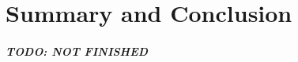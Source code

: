 \graphicspath{{conclusion/fig/}}

\chapter{Summary and Conclusion}
\label{chap:conclusion}

\paragraph{TODO: NOT FINISHED}

